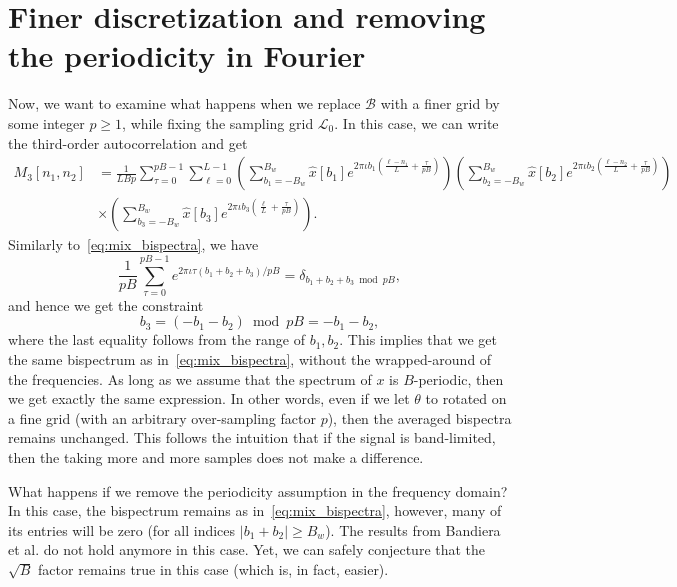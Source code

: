 \documentclass[english,12pt]{article}
\newcommand{\I}{\iota}
\newcommand{\tB}{B_w}
\numberwithin{equation}{section}
\numberwithin{mytheorem}{section} %
\begin{document}
\section{Finer discretization and removing the periodicity in Fourier}

Now, we want to examine what happens when we replace $\mathcal{B}$ with a finer grid by some integer $p\geq 1$, while fixing the sampling grid $\mathcal{L}_0$. 
In this case, we can write  the third-order autocorrelation and get 
\begin{equation}
\begin{split}
M_3[n_1,n_2] 
&= \frac{1}{LBp}\sum_{\tau=0}^{pB-1}\sum_{\ell=0}^{L-1} 
\left(\sum_{b_1=-\tB}^{\tB}\hat{x}[b_1]e^{2\pi\I b_1 \left(\frac{\ell-n_1}{L} + \frac{\tau}{pB}\right) }\right) 
\left(\sum_{b_2=-\tB}^{\tB}\hat{x}[b_2]e^{2\pi\I b_2 \left(\frac{\ell-n_2}{L} + \frac{\tau}{pB}\right) } \right) \\
&\times \left(\sum_{b_3=-\tB}^{\tB}\hat{x}[b_3]e^{2\pi\I b_3 \left(\frac{\ell}{L} + \frac{\tau}{pB}\right) }\right). 
\end{split}
\end{equation}
Similarly to~\eqref{eq:mix_bispectra}, we have
\begin{equation} \label{eq:sum2}
\frac{1}{pB}\sum_{\tau=0}^{pB-1}e^{2\pi\I\tau (b_1+b_2+b_3)/pB} = \delta_{b_1+b_2+b_3\bmod pB},
\end{equation}
and hence we get the constraint $$b_3=(-b_1-b_2)\bmod pB=-b_1-b_2,$$
where the last equality follows from the range of $b_1,b_2$.
This implies that we get the same bispectrum as in~\eqref{eq:mix_bispectra}, without the wrapped-around of the frequencies. As long as we assume that the spectrum of $x$ is $B$-periodic, then we get exactly the same expression. 
In other words, even if we let $\theta$ to rotated on a fine grid (with an arbitrary over-sampling factor $p$), then the averaged bispectra remains unchanged.
This follows the intuition that if the signal is band-limited, then the taking more and more samples does not make a difference. 

What happens if we remove the periodicity assumption in the frequency domain? In this case, the bispectrum remains as in~\eqref{eq:mix_bispectra}, however, many of its entries will be zero (for all indices $\vert b_1+b_2\vert \geq \tB$). The results from Bandiera et al. do not hold anymore in this case. Yet, we can safely conjecture that the $\sqrt{B}$ factor remains true in this case (which is, in fact, easier).  


\end{document}
